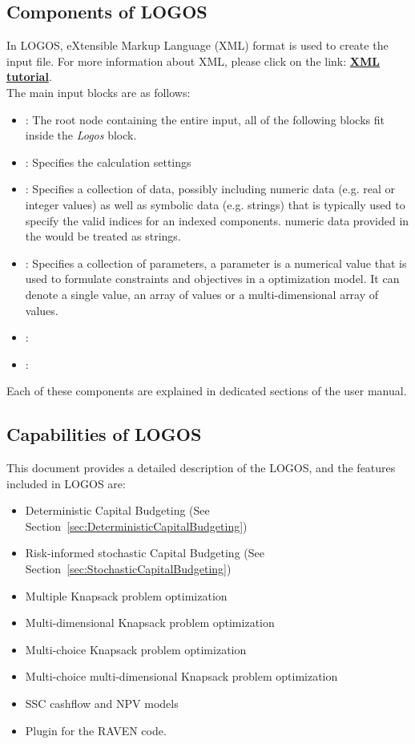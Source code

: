 \subsection{Components of LOGOS}
In LOGOS, eXtensible Markup Language (XML) format is used to create the input file. For more
information about XML, please click on the link:
\href{https://www.w3schools.com/xml/default.asp}{\textbf{XML tutorial}}.
%
\\The main input blocks are as follows:
\begin{itemize}
  \item {}: The root node containing the
  entire input, all of
  the following blocks fit inside the \emph{Logos} block.
  \item {}: Specifies the calculation settings
  \item {}: Specifies a collection of data, possibly including
	numeric data (e.g. real or integer values) as well as symbolic data (e.g. strings)
	that is typically used to specify the valid indices for an indexed components.
	\nb numeric data provided in the  would be treated as strings.
	\item {}: Specifies a collection of parameters, a parameter
	is a numerical value that is used to formulate constraints and objectives in a
	optimization model. It can denote a single value, an array of values or a multi-dimensional
	array of values.
	\item {}:
	\item {}:
\end{itemize}

Each of these components are explained in dedicated sections of the user manual.

\subsection{Capabilities of LOGOS}
This document provides a detailed description of the LOGOS, and the features included in LOGOS are:
\begin{itemize}
	\item Deterministic Capital Budgeting (See Section~\ref{sec:DeterministicCapitalBudgeting})
	\item Risk-informed stochastic Capital Budgeting (See Section~\ref{sec:StochasticCapitalBudgeting})
	\item Multiple Knapsack problem optimization
	\item Multi-dimensional Knapsack problem optimization
	\item Multi-choice Knapsack problem optimization
	\item Multi-choice multi-dimensional Knapsack problem optimization
	\item SSC cashflow and NPV models
	\item Plugin for the RAVEN code.
\end{itemize}
